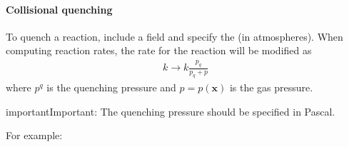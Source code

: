 \documentclass[letterpaper,10pt,english]{sphinxmanual}
\begin{document}
\paragraph{Collisional quenching}
\label{\detokenize{Applications/CdrPlasmaModel:collisional-quenching}}
\sphinxAtStartPar
To quench a reaction, include a field  and specify the  (in atmospheres).
When computing reaction rates, the rate for the reaction will be modified as
\begin{equation*}
\begin{split}k \rightarrow k\frac{p_q}{p_q + p}\end{split}
\end{equation*}
\sphinxAtStartPar
where \(p^q\) is the quenching pressure and \(p = p(\mathbf{x})\) is the gas pressure.

\begin{sphinxadmonition}{important}{Important:}
\sphinxAtStartPar
The quenching pressure should be specified in Pascal.
\end{sphinxadmonition}

\sphinxAtStartPar
For example:

\begin{sphinxVerbatim}[commandchars=\\\{\},formatcom=\scriptsize]
  \PYG{p}{[}
       
       
       
       
       
       
       
       
       
       
       
  \PYG{p}{]}
\end{sphinxVerbatim}
\end{document}
